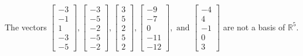 \begin{exercise}
\begin{exerciseStatement}
  \end{exerciseStatement}
  \begin{exerciseAnswer}
   The vectors \(\left[\begin{array}{r}
-3 \\
-1 \\
1 \\
-3 \\
-5
\end{array}\right] , \left[\begin{array}{r}
-3 \\
-5 \\
-2 \\
-5 \\
-2
\end{array}\right] , \left[\begin{array}{r}
3 \\
5 \\
2 \\
5 \\
2
\end{array}\right] , \left[\begin{array}{r}
-9 \\
-7 \\
0 \\
-11 \\
-12
\end{array}\right] , \text{ and } \left[\begin{array}{r}
-4 \\
4 \\
-1 \\
0 \\
3
\end{array}\right]\) 
  	 are not  a basis of \(\mathbb{R}^5\).
  


  \end{exerciseAnswer}
\end{exercise}